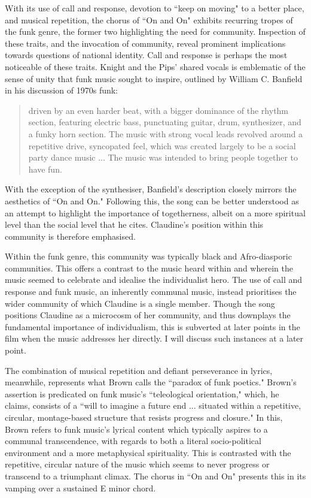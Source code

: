 With its use of call and response, devotion to ``keep on moving" to a better place, and musical repetition, the chorus of ``On and On" exhibits recurring tropes of the funk genre, the former two highlighting the need for community.
Inspection of these traits, and the invocation of community, reveal prominent implications towards questions of national identity.
Call and response is perhaps the most noticeable of these traits.
Knight and the Pips' shared vocals is emblematic of the sense of unity that funk music sought to inspire, outlined by William C. Banfield in his discussion of 1970s funk:
\begin{quote}
driven by an even harder beat, with a bigger dominance of the rhythm section, featuring electric bass, punctuating guitar, drum, synthesizer, and a funky horn section. The music with strong vocal leads revolved around a repetitive drive, syncopated feel, which was created largely to be a social party dance music ... The music was intended to bring people together to have fun.\autocite[][159]{banfield_cultural_2010}
\end{quote}
With the exception of the synthesiser, Banfield's description closely mirrors the aesthetics of ``On and On." 
Following this, the song can be better understood as an attempt to highlight the importance of togetherness, albeit on a more spiritual level than the social level that he cites.
Claudine's position within this community is therefore emphasised.

Within the funk genre, this community was typically black and Afro-diasporic communities. 
This offers a contrast to the music heard within \textcite{sherman_big_1971} and \textcite{parks_super_1972} wherein the music seemed to celebrate and idealise the individualist hero.
The use of call and response and funk music, an inherently communal music, instead prioritises the wider community of which Claudine is a single member. 
Though the song positions Claudine as a microcosm of her community, and thus downplays the fundamental importance of individualism, this is subverted at later points in the film when the music addresses her directly.
I will discuss such instances at a later point.

The combination of musical repetition and defiant perseverance in lyrics, meanwhile, represents what Brown calls the ``paradox of funk poetics."\autocite[][491]{brown_funk_1994}
Brown's assertion is predicated on funk music's ``teleological orientation," which, he claims, consists of a ``will to imagine a future end ... situated within a repetitive, circular, montage-based structure that resists progress and closure."\autocite[][491]{brown_funk_1994}
In this, Brown refers to funk music's lyrical content which typically aspires to a communal transcendence, with regards to both a literal socio-political environment and a more metaphysical spirituality.
This is contrasted with the repetitive, circular nature of the music which seems to never progress or transcend to a triumphant climax.
The chorus in ``On and On" presents this in its vamping over a sustained E minor chord.

